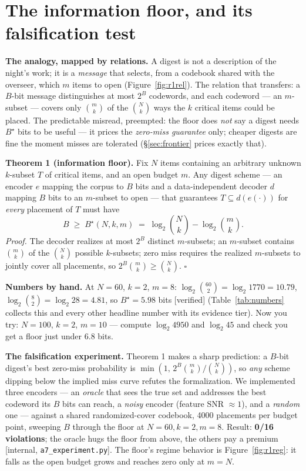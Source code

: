 \documentclass[11pt,a4paper]{article}
\begin{document}
\section{The information floor, and its falsification test}\label{sec:floor}
\textbf{The analogy, mapped by relations.} A digest is not a description of the night's work; it is a \emph{message} that selects, from a codebook shared with the overseer, which $m$ items to open (Figure~\ref{fig:r1rel}). The relation that transfers: a $B$-bit message distinguishes at most $2^B$ codewords, and each codeword --- an $m$-subset --- covers only $\binom{m}{k}$ of the $\binom{N}{k}$ ways the $k$ critical items could be placed. The predictable misread, preempted: the floor does \emph{not} say a digest needs $B^\star$ bits to be useful --- it prices the \emph{zero-miss guarantee} only; cheaper digests are fine the moment misses are tolerated (\S\ref{sec:frontier} prices exactly that).

\begin{thebox}
\textbf{Theorem 1 (information floor).} Fix $N$ items containing an arbitrary unknown $k$-subset $T$ of critical items, and an open budget $m$. Any digest scheme --- an encoder $e$ mapping the corpus to $B$ bits and a data-independent decoder $d$ mapping $B$ bits to an $m$-subset to open --- that guarantees $T\subseteq d(e(\cdot))$ for \emph{every} placement of $T$ must have
\[
B \;\ge\; B^\star(N,k,m) \;=\; \log_2\binom{N}{k}-\log_2\binom{m}{k}.
\]
\emph{Proof.} The decoder realizes at most $2^B$ distinct $m$-subsets; an $m$-subset contains $\binom{m}{k}$ of the $\binom{N}{k}$ possible $k$-subsets; zero miss requires the realized $m$-subsets to jointly cover all placements, so $2^B\binom{m}{k}\ge\binom{N}{k}$. $\square$
\end{thebox}

\textbf{Numbers by hand.} At $N{=}60$, $k{=}2$, $m{=}8$: $\log_2\binom{60}{2}=\log_2 1770=10.79$, $\log_2\binom{8}{2}=\log_2 28=4.81$, so $B^\star=5.98$ bits [verified] (Table~\ref{tab:numbers} collects this and every other headline number with its evidence tier). Now you try: $N{=}100$, $k{=}2$, $m{=}10$ --- compute $\log_2 4950$ and $\log_2 45$ and check you get a floor just under $6.8$ bits.

\textbf{The falsification experiment.} Theorem 1 makes a sharp prediction: a $B$-bit digest's best zero-miss probability is $\min(1,\,2^B\binom{m}{k}/\binom{N}{k})$, so \emph{any} scheme dipping below the implied miss curve refutes the formalization. We implemented three encoders --- an \emph{oracle} that sees the true set and addresses the best codeword its $B$ bits can reach, a \emph{noisy} encoder (feature SNR $\approx 1$), and a \emph{random} one --- against a shared randomized-cover codebook, 4000 placements per budget point, sweeping $B$ through the floor at $N{=}60,k{=}2,m{=}8$. Result: \textbf{0/16 violations}; the oracle hugs the floor from above, the others pay a premium [internal, \texttt{a7\_experiment.py}]. The floor's regime behavior is Figure~\ref{fig:r1reg}: it falls as the open budget grows and reaches zero only at $m=N$.
\end{document}
